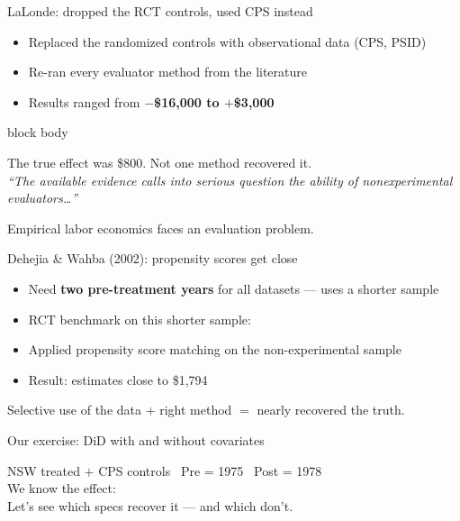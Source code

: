 \documentclass[aspectratio=169,11pt]{beamer}
\newcommand{\emphbox}[1]{%
  \begin{beamercolorbox}[rounded=true,sep=7pt,wd=\linewidth]{block body}%
    \small\color{slate}\raggedright #1%
  \end{beamercolorbox}}
\begin{document}
\begin{frame}{LaLonde: dropped the RCT controls, used CPS instead}
\vspace{0.6em}
\begin{itemize}\setlength\itemsep{0.55em}
  \item Replaced the randomized controls with observational data (CPS, PSID)
  \item Re-ran every evaluator method from the literature
  \item Results ranged from \textbf{$-$\$16,000 to $+$\$3,000}
\end{itemize}
\vspace{0.5em}
\emphbox{The true effect was \$800. Not one method recovered it. \\
\textit{``The available evidence calls into serious question the ability of nonexperimental evaluators\ldots''}}
\vspace{0.3em}
\begin{center}\color{warmgray}\small
Empirical labor economics faces an evaluation problem.
\end{center}
\end{frame}

\begin{frame}{Dehejia \& Wahba (2002): propensity scores get close}
\vspace{0.6em}
\begin{itemize}\setlength\itemsep{0.55em}
  \item Need \textbf{two pre-treatment years} for all datasets --- uses a shorter sample
  \item RCT benchmark on this shorter sample: 
  \item Applied propensity score matching on the non-experimental sample
  \item Result: estimates close to \$1,794
\end{itemize}
\vspace{0.5em}
\begin{center}\color{warmgray}\small
Selective use of the data $+$ right method $=$ nearly recovered the truth.
\end{center}
\end{frame}

\begin{frame}{Our exercise: DiD with and without covariates}
\vspace{0.8em}
\begin{center}
NSW treated $+$ CPS controls \textperiodcentered\
Pre = 1975 \textperiodcentered\ Post = 1978\\[0.6em]
\large We know the effect: \\[0.6em]
\normalsize\color{warmgray}
Let's see which specs recover it --- and which don't.
\end{center}
\end{frame}
\end{document}
